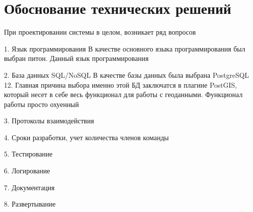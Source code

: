 \section*{\Large{Обоснование технических решений}}
При проектировании системы в целом, возникает ряд вопросов



1. Язык программирования
В качестве основного языка программирования был выбран питон.
Данный язык программирования







2. База данных
SQL/NoSQL
В качестве базы данных была выбрана PostgreSQL 12.
Главная причина выбора именно этой БД заключатся в плагине PostGIS, который несет в себе весь функционал для
работы с геоданными. Функционал работы просто охуенный



3. Протоколы взаимодействия


4. Сроки разработки, учет количества членов команды



5. Тестирование


6. Логирование


7. Документация


8. Развертывание
